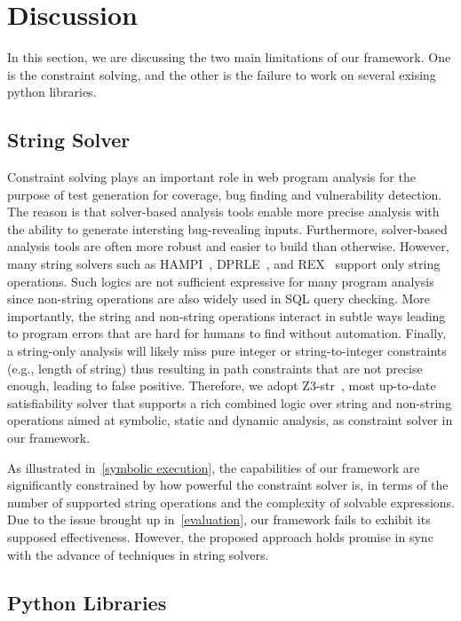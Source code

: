\documentclass[conference]{IEEEtran}
\begin{document}
\section{Discussion}
\label{discussion}
In this section, we are discussing the two main limitations of our framework. One is the constraint solving, and the other is the failure to work on several exising python libraries.

\subsection{String Solver}
Constraint solving plays an important role in web program analysis for the purpose of test generation for coverage, bug finding and vulnerability detection. The reason is that solver-based analysis tools enable more precise analysis with the ability to generate intersting bug-revealing inputs. Furthermore, solver-based analysis tools are often more robust and easier to build than otherwise. However, many string solvers such as HAMPI~\cite{hampi}, DPRLE~\cite{dprle}, and REX~\cite{rex} support only string operations. Such logics are not sufficient expressive for many program analysis since non-string operations are also widely used in SQL query checking. More importantly, the string and non-string operations interact in subtle ways leading to program errors that are hard for humans to find without automation. Finally, a string-only analysis will likely miss pure integer or string-to-integer constraints (e.g., length of string) thus resulting in path constraints that are not precise enough, leading to false positive. Therefore, we adopt Z3-str~\cite{z3-str}, most up-to-date satisfiability solver that supports a rich combined logic over string and non-string operations aimed at symbolic, static and dynamic analysis, as constraint solver in our framework.

As illustrated in~\ref{symbolic execution}, the capabilities of our framework are significantly constrained by how powerful the constraint solver is, in terms of the number of supported string operations and the complexity of solvable expressions. Due to the issue brought up in~\ref{evaluation}, our framework fails to exhibit its supposed effectiveness. However, the proposed approach holds promise in sync with the advance of techniques in string solvers.

\subsection{Python Libraries}
\end{document}
